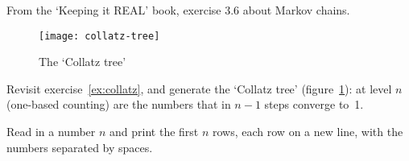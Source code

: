\begin{exercise}
  From the `Keeping it REAL' book, exercise 3.6 about Markov chains.
\end{exercise}

\begin{figure}[ht]
  \texttt{[image: collatz-tree]}
  \caption{The `Collatz tree'}
  \label{fig:collatz-tree}
\end{figure}

\begin{exercise}
  Revisit exercise~\ref{ex:collatz},
  and generate the `Collatz tree' (figure~\ref{fig:collatz-tree}):
  at level $n$ (one-based counting)
  are the numbers that in $n-1$ steps converge to~1.

  Read in a number $n$ and print the first $n$ rows,
  each row on a new line, with the numbers separated by spaces.
\end{exercise}

\ifIncludeAnswers
\else
\endinput
\fi

\Level 0 {Homework discussions}

\Level 1 {Pascal}
\label{sec:pascal-discussion}

\begin{multicols}{2}
  \scriptsize
  \lstset{basicstyle=scriptsize}
  
  \lstset{basicstyle=footnotesize}
\end{multicols}
